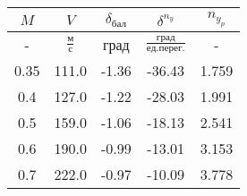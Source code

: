 \begin{tabular}{|c|c|c|c|c|}
\hline
$M$ & $V$ & $\delta_{бал}$ & $\delta^{n_y}$ & $n_{y_{p}}$ \\ 
\hline
- & $\frac{м}{с}$ & град & $\frac{град}{ед.перег.}$ & - \\ 
\hline
0.35 & 111.0 & -1.36 & -36.43 & 1.759 \\ 
\hline
0.4 & 127.0 & -1.22 & -28.03 & 1.991 \\ 
\hline
0.5 & 159.0 & -1.06 & -18.13 & 2.541 \\ 
\hline
0.6 & 190.0 & -0.99 & -13.01 & 3.153 \\ 
\hline
0.7 & 222.0 & -0.97 & -10.09 & 3.778 \\ 
\hline
\end{tabular}